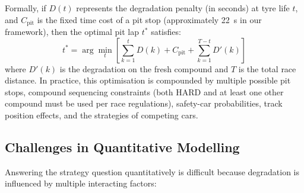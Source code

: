 \documentclass[journal,twoside]{IEEEtran}
\begin{document}
Formally, if $D(t)$ represents the degradation penalty (in seconds) at
tyre life $t$, and $C_{\text{pit}}$ is the fixed time cost of a pit
stop (approximately \SI{22}{\second} in our framework), then the
optimal pit lap $t^{*}$ satisfies:
\begin{equation}
  t^{*} = \arg\min_{t} \left[\sum_{k=1}^{t} D(k) + C_{\text{pit}} +
  \sum_{k=1}^{T-t} D'(k)\right]
  \label{eq:strategy_opt}
\end{equation}
where $D'(k)$ is the degradation on the fresh compound and $T$ is the
total race distance.  In practice, this optimisation is compounded by
multiple possible pit stops, compound sequencing constraints (both
HARD and at least one other compound must be used per race regulations),
safety-car probabilities, track position effects, and the strategies of
competing cars.

\subsection{Challenges in Quantitative Modelling}

Answering the strategy question quantitatively is difficult because
degradation is influenced by multiple interacting factors:
\end{document}
